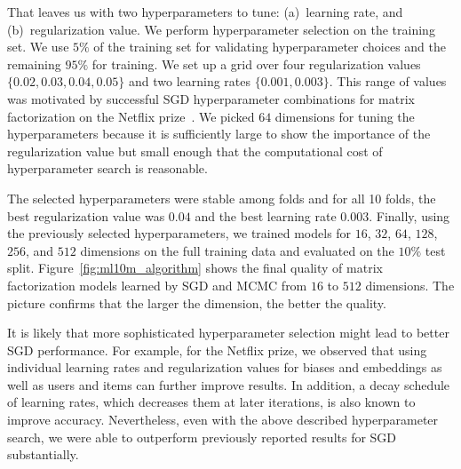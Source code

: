 \documentclass{article}
\begin{document}
That leaves us with two hyperparameters to tune: (a)~learning rate, and (b)~regularization value.
We perform hyperparameter selection on the training set.
We use $5\%$ of the training set for validating hyperparameter choices and the remaining $95\%$ for training.
We set up a grid over four regularization values $\{0.02, 0.03, 0.04, 0.05\}$ and two learning rates $\{0.001, 0.003\}$.
This range of values was motivated by successful SGD hyperparameter combinations for matrix factorization on the Netflix prize~\cite{paterek:kddcup07,koren:kdd08}.
We picked $64$ dimensions for tuning the hyperparameters because it is sufficiently large to show the importance of the regularization value but small enough that the computational cost of hyperparameter search is reasonable.

The selected hyperparameters were stable among folds and for all 10 folds, the best regularization value was $0.04$ and the best learning rate $0.003$.
Finally, using the previously selected hyperparameters, we trained models for $16$, $32$, $64$, $128$, $256$, and $512$ dimensions on the full training data and evaluated on the $10\%$ test split.
Figure~\ref{fig:ml10m_algorithm} shows the final quality of matrix factorization models learned by SGD and MCMC from $16$ to $512$ dimensions.
The picture confirms that the larger the dimension, the better the quality.

It is likely that more sophisticated hyperparameter selection might lead to better SGD performance.
For example, for the Netflix prize, we observed that using individual learning rates and regularization values for biases and embeddings as well as users and items can further improve results. In addition, a decay schedule of learning rates, which decreases them at later iterations, is also known to improve accuracy.
Nevertheless, even with the above described hyperparameter search, we were able to outperform previously reported results for SGD substantially.
\end{document}
